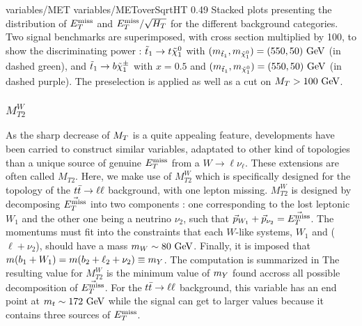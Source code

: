                          {variables/MET}
                         {variables/METoverSqrtHT}
                         {0.49}
                         {Stacked plots presenting the distribution of $E_T^\text{miss}$ and $E_T^\text{miss} /
                         \sqrt{H_T}$ for the different background categories. Two
                         signal benchmarks are superimposed, with cross section multiplied
                         by 100, to show the discriminating power :
                         $\tilde{t}_1 \rightarrow t \tilde{\chi}_1^0$ with $(m_{\tilde{t}_1},m_{\tilde{\chi}_1^0})
                         = (550,50)~\text{GeV}$ (in dashed green), and $\tilde{t}_1 \rightarrow b \tilde{\chi}_1^\pm$
                         with $x = 0.5$ and $(m_{\tilde{t}_1}, m_{\tilde{\chi}_1^0}) = (550,50)~\text{GeV}$
                         (in dashed purple). The preselection is applied as well as a cut
                         on $M_T > 100 ~\text{GeV}$.}

        \subsubsection{$M_{T2}^{W}$}

        As the sharp decrease of $M_T$ is a quite appealing feature, developments have been
        carried \cite{MT2variables} to construct similar variables, adaptated to other kind
        of topologies than
        a unique source of genuine $E_T^\text{miss}$ from a $W \rightarrow \ell \nu_\ell$.  These extensions are
        often called $M_{T2}$. Here, we make use of $M_{T2}^W$ which is specifically
        designed for the topology of the $t\bar{t} \rightarrow \ell \ell$ background, with
        one lepton missing. $M_{T2}^W$ is designed by decomposing $\vec{E_T^\text{miss}}$ into two
        components : one corresponding to the lost leptonic $W_1$ and the other one being
        a neutrino $\nu_2$, such that $\vec{p}_{W_1} + \vec{p}_{\nu_2} = \vec{E_T^\text{miss}}$.
        The momentums must fit into the constraints that each $W$-like systems, $W_1$ and
        ($\ell + \nu_2$), should have a mass $m_W \sim 80 ~\text{GeV}$. Finally, it is imposed that
        $m(b_1 + W_1) = m(b_2 + \ell_2 + \nu_2) \equiv m_{Y}$. The computation is
        summarized in 
        The resulting value for $M_{T2}^W$ is the minimum value of $m_{Y}$ found accross
        all possible decomposition of $\vec{E_T^\text{miss}}$. For the $t\bar{t} \rightarrow \ell \ell$ background,
        this variable has an end point at $m_t \sim 172~\text{GeV}$ while the signal can get to
        larger values because it contains three sources of $E_T^\text{miss}$.

